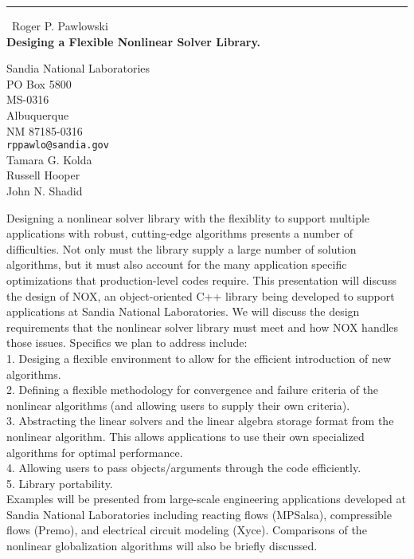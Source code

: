 \documentclass{report}
\begin{document}
\begin{center}
\rule{6in}{1pt} \
{\large Roger P. Pawlowski \\
{\bf Desiging a Flexible Nonlinear Solver Library.}}

Sandia National Laboratories \\ PO Box 5800 \\ MS-0316 \\ Albuquerque \\ NM 87185-0316
\\
{\tt rppawlo@sandia.gov}\\
Tamara G. Kolda\\
Russell Hooper\\
	John N. Shadid\end{center}

Designing a nonlinear solver library with the flexiblity to support multiple applications with robust,
cutting-edge algorithms presents a number of difficulties.
Not only must the library supply a large number of solution algorithms,
but it must also account for the many application specific optimizations that production-level codes require.
This presentation will discuss the design of NOX,
an object-oriented C++ library being developed to support applications at Sandia National Laboratories.
We will discuss the design requirements that the nonlinear solver library must meet and how NOX handles those issues.
Specifics we plan to address include: \\1.
Desiging a flexible environment to allow for the efficient introduction of new algorithms.
\\2.
Defining a flexible methodology for convergence and failure criteria of the nonlinear algorithms (and allowing users to supply their own criteria).
\\3.
Abstracting the linear solvers and the linear algebra storage format from the nonlinear algorithm.
This allows applications to use their own specialized algorithms for optimal performance.
\\4.
Allowing users to pass objects/arguments through the code efficiently.
\\5.
Library portability.
\\Examples will be presented from large-scale engineering applications developed at Sandia National Laboratories including reacting flows (MPSalsa),
compressible flows (Premo),
and electrical circuit modeling (Xyce).
Comparisons of the nonlinear globalization algorithms will also be briefly discussed.
\end{document}
